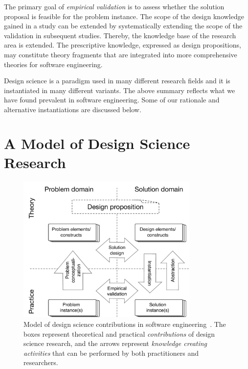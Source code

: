 \documentclass[graybox]{svmult}
\begin{document}

 The primary goal of \emph{empirical validation} is to assess whether the solution proposal is feasible for the problem instance. The scope of the design knowledge gained in a study can be extended by systematically extending the scope of the validation in subsequent studies. Thereby, the knowledge base of the research area is extended. The prescriptive knowledge, expressed as design propositions, may constitute theory fragments that are integrated into more comprehensive theories for software engineering. 


Design science is a paradigm used in many different research fields and it is instantiated in many different variants. The above summary reflects what we have found prevalent in software engineering. Some of our rationale and alternative instantiations are discussed below.



\section{A Model of Design Science Research}
\label{sec:DesignScienceResearch}


\begin{figure}[t]
\centering
 \includegraphics[width=0.8\textwidth]{Figures/DS_model.pdf}
\caption{Model of design science contributions in software engineering~\cite{Engstrom19arxiv}. The boxes represent theoretical and practical \emph{contributions} of design science research, and the arrows represent \emph{knowledge creating activities} that can be performed by both practitioners and researchers.}
\label{fig:DS_model}       %
\end{figure}
\end{document}
